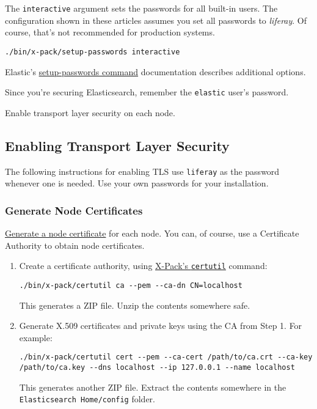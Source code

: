 The \texttt{interactive} argument sets the passwords for all built-in
users. The configuration shown in these articles assumes you set all
passwords to \emph{liferay}. Of course, that's not recommended for
production systems.

\begin{verbatim}
./bin/x-pack/setup-passwords interactive
\end{verbatim}

Elastic's
\href{https://www.elastic.co/guide/en/elasticsearch/reference/6.1/setup-passwords.html}{setup-passwords
command} documentation describes additional options.

Since you're securing Elasticsearch, remember the \texttt{elastic}
user's password.

Enable transport layer security on each node.

\subsection{Enabling Transport Layer
Security}\label{enabling-transport-layer-security}

The following instructions for enabling TLS use \texttt{liferay} as the
password whenever one is needed. Use your own passwords for your
installation.

\subsubsection{Generate Node
Certificates}\label{generate-node-certificates-1}

\href{https://www.elastic.co/guide/en/elasticsearch/reference/6.1/configuring-tls.html\#node-certificates}{Generate
a node certificate} for each node. You can, of course, use a Certificate
Authority to obtain node certificates.

\begin{enumerate}
\def\labelenumi{\arabic{enumi}.}
\item
  Create a certificate authority, using
  \href{https://www.elastic.co/guide/en/elasticsearch/reference/6.1/certutil.html}{X-Pack's
  \texttt{certutil}} command:

\begin{verbatim}
./bin/x-pack/certutil ca --pem --ca-dn CN=localhost
\end{verbatim}

  This generates a ZIP file. Unzip the contents somewhere safe.
\item
  Generate X.509 certificates and private keys using the CA from Step 1.
  For example:

\begin{verbatim}
./bin/x-pack/certutil cert --pem --ca-cert /path/to/ca.crt --ca-key /path/to/ca.key --dns localhost --ip 127.0.0.1 --name localhost
\end{verbatim}

  This generates another ZIP file. Extract the contents somewhere in the
  \texttt{Elasticsearch\ Home/config} folder.
\end{enumerate}

